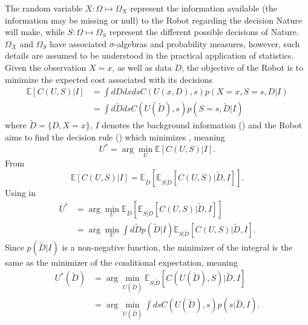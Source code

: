 The random variable $X: \Omega \mapsto \Omega_X$ represent the information available (the information may be missing or null) to the Robot regarding the decision Nature will make, while $S: \Omega \mapsto \Omega_S$ represent the different possible decisions of Nature. $\Omega_X$ and $\Omega_S$ have associated $\sigma$-algebras and probability measures, however, such details are assumed to be understood in the practical application of statistics. Given the observation $X=x$, as well as data $D$, the objective of the Robot is to minimize the expected cost associated with its decisions\cite{murphy2023probabilistic}
\begin{equation}
	\begin{split}
		\mathbb{E}[C(U, S)|I] &= \int dD dx ds  C(U(x,D),s) p(X=x,S=s,D|I)\\
		& = \int d\tilde{D} ds  C(U(\tilde{D}),s) p(S=s,\tilde{D}|I)
	\end{split}
	\label{eq:conditional_expected_cost}
\end{equation}
where $\tilde{D} = \{D,X= x\}$, $I$ denotes the background information () and the Robot aims to find the decision rule () which minimizes , meaning
\begin{equation}
	U^* = \arg\min_{U} \mathbb{E}[C(U, S)|I].
	\label{eq:decision_rule_x}
\end{equation}	
From 
\begin{equation}
	\mathbb{E}[C(U, S)|I] = \mathbb{E}_{\tilde{D}}[\mathbb{E}_{S|\tilde{D}}[C(U, S)|\tilde{D},I]].
	\label{eq:total2}
\end{equation}
Using  in 
\begin{equation}
	\begin{split}
		U^* &= \arg\min_{U} \mathbb{E}_{\tilde{D}}[\mathbb{E}_{S|\tilde{D}}[C(U, S)|\tilde{D},I]]\\
		&= \arg\min_{U} \int d\tilde{D}p(\tilde{D}|I) \mathbb{E}_{S|\tilde{D}}[C(U, S)|\tilde{D},I].
	\end{split}
	\label{eq:decision_rule2}
\end{equation}
Since $p(\tilde{D}|I)$ is a non-negative function, the minimizer of the integral is the same as the minimizer of the conditional expectation, meaning
\begin{equation}
	\begin{split}
		U^*(\tilde{D}) &= \arg\min_{U(\tilde{D})} \mathbb{E}_{S|\tilde{D}}[C(U(\tilde{D}), S)|\tilde{D},I]\\
		& = \arg\min_{U(\tilde{D})}\int  ds C(U(\tilde{D}),s) p(s|\tilde{D},I).
	\end{split}
	\label{eq:decision_rule3}
\end{equation}

